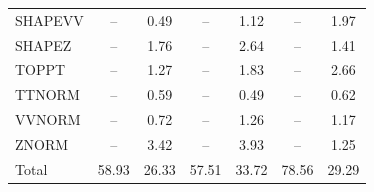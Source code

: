 \begin{table}[H]
\begin{center}
\begin{footnotesize}
\begin{tabular}{lcccccc}
				SHAPEVV & -- &  0.49 & -- &  1.12 & -- &  1.97 \\
				SHAPEZ & -- &  1.76 & -- &  2.64 & -- &  1.41 \\
				TOPPT & -- &  1.27 & -- &  1.83 & -- &  2.66 \\
				TTNORM & -- &  0.59 & -- &  0.49 & -- &  0.62 \\
				VVNORM & -- &  0.72 & -- &  1.26 & -- &  1.17 \\
				ZNORM & -- &  3.42 & -- &  3.93 & -- &  1.25 \\
				Total &  58.93  &  26.33 &  57.51  &  33.72 &  78.56  &  29.29 \\ \hline \hline
			\end{tabular}
			\label{tab:SysUncertainties_2100}
        \end{footnotesize}
	\end{center}
\end{table}


